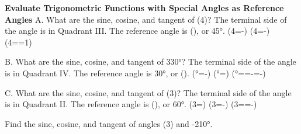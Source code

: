 \documentclass{article}
\newenvironment{example}[1]{}{}         %
\newenvironment{tryit}[1]{}{}           %
\newcommand{\answer}[1]{}               %
\newcommand{\placeholder}[2]{}          %
\newcommand{\te}[1]{}                   %
\begin{document}
\begin{example}{4}
\textbf{Evaluate Trigonometric Functions with Special Angles as Reference Angles}
A. What are the sine, cosine, and tangent of (\frac{5\pi}4)?
The terminal side of the angle is in Quadrant III. The reference angle is (\frac{}), or 45°.
(\sin\frac{5\pi}4=-)
(\cos\frac{5\pi}4=-)
(\tan\frac{5\pi}4==1)
\placeholder{graph}{Unit circle O with arrowed x/y axes +/-1. Red radius in Quadrant III to (-sqrt2/2,-sqrt2/2) and counterclockwise 5pi/4 arc from positive x-axis; blue pi/4 reference arc below negative x-axis.}
\answer{(\sin\frac{5\pi}4=-\frac{\sqrt2}{2}), (\cos\frac{5\pi}4=-\frac{\sqrt2}{2}), (\tan\frac{5\pi}4=1)}
B. What are the sine, cosine, and tangent of 330°?
The terminal side of the angle is in Quadrant IV. The reference angle is 30°, or (\frac{}).
(°=-)
(°=)
(°==-=-)
\placeholder{graph}{Unit circle O, arrowed x/y axes +/-1. Red terminal radius in Quadrant IV to (sqrt3/2,-1/2), red 330° counterclockwise arc and blue reference angle 30° below positive x-axis.}
\te{STUDY TIP Recall that in a 30°-60°-90° right triangle, if the shorter leg has length x, the hypotenuse has length 2x, and the longer leg has length (x\sqrt3).}
\answer{(\sin330°=-\frac12), (\cos330°=\frac{\sqrt3}{2}), (\tan330°=-\frac{\sqrt3}{3})}
C. What are the sine, cosine, and tangent of (\frac{2\pi}3)?
The terminal side of the angle is in Quadrant II. The reference angle is (\frac{}), or 60°.
(\sin\frac{2\pi}3=)
(\cos\frac{2\pi}3=-)
(\tan\frac{2\pi}3==-)
\placeholder{graph}{Unit circle O, arrowed x/y axes +/-1. Red terminal radius to (-1/2,sqrt3/2), counterclockwise red angle 2pi/3, blue pi/3 reference angle above negative x-axis.}
\answer{(\sin\frac{2\pi}3=\frac{\sqrt3}{2}), (\cos\frac{2\pi}3=-\frac12), (\tan\frac{2\pi}3=-\sqrt3)}
\end{example}
\begin{tryit}{4}
Find the sine, cosine, and tangent of angles (\frac{4\pi}3) and -210°.
\answer{(\sin\frac{4\pi}3=-\frac{\sqrt3}{2}), (\cos\frac{4\pi}3=-\frac12), (\tan\frac{4\pi}3=\frac{\sqrt3}{3}); (\sin(-210°)=\frac12), (\cos(-210°)=-\frac{\sqrt3}{2}), (\tan(-210°)=-\frac{\sqrt3}{3})}
\te{Printed (\tan\frac{4\pi}3=\frac{\sqrt3}{3}); likely (\sqrt3).}
\end{tryit}
\end{document}
